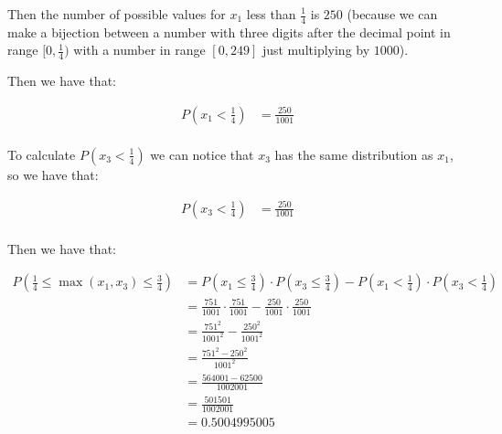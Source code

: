 Then the number of possible values for $x_1$ less than $\frac{1}{4}$
is $250$ (because we can make a bijection between a number with three
digits after the decimal point in range $[0,\frac{1}{4})$ with a
                number in range $[0,249]$ just multiplying by $1000$).

                Then we have that:

                \begin{equation*}
                    \begin{split}
                        P(x_1 < \frac{1}{4}) & = \frac{250}{1001} \\
                    \end{split}
                \end{equation*}

                To calculate $P(x_3 < \frac{1}{4})$ we can notice that $x_3$ has
                the same distribution as $x_1$, so we have that:

                \begin{equation*}
                    \begin{split}
                        P(x_3 < \frac{1}{4}) & = \frac{250}{1001} \\
                    \end{split}
                \end{equation*}

                Then we have that:

                \begin{equation*}
                    \begin{split}
                        P(\frac{1}{4}\leq\max(x_1, x_3)\leq\frac{3}{4}) & = P(x_1 \leq \frac{3}{4}) \cdot P(x_3 \leq \frac{3}{4}) - P(x_1 < \frac{1}{4}) \cdot P(x_3 < \frac{1}{4}) \\
                                                                        & = \frac{751}{1001} \cdot \frac{751}{1001} - \frac{250}{1001} \cdot \frac{250}{1001}                       \\
                                                                        & = \frac{751^2}{1001^2} - \frac{250^2}{1001^2}                                                             \\
                                                                        & = \frac{751^2 - 250^2}{1001^2}                                                                            \\
                                                                        & = \frac{564001 - 62500}{1002001}                                                                          \\
                                                                        & = \frac{501501}{1002001}                                                                                  \\
                                                                        & = 0.5004995005
                    \end{split}
                \end{equation*}

